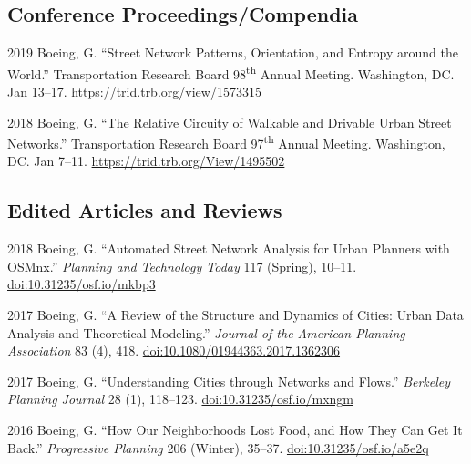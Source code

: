 \documentclass[12pt,letterpaper]{report}
\begin{document}
    \subsection*{Conference Proceedings/Compendia}

    \begin{tablist}

        \item[2019] \tab Boeing, G. \enquote{Street Network Patterns, Orientation, and Entropy around the World.} Transportation Research Board 98\textsuperscript{th} Annual Meeting. Washington, DC. Jan 13--17. \href{https://trid.trb.org/view/1573315}{https://trid.trb.org/view/1573315}

        \item[2018] \tab Boeing, G. \enquote{The Relative Circuity of Walkable and Drivable Urban Street Networks.} Transportation Research Board 97\textsuperscript{th} Annual Meeting. Washington, DC. Jan 7--11. \href{https://trid.trb.org/View/1495502}{https://trid.trb.org/View/1495502}

    \end{tablist}



    \subsection*{Edited Articles and Reviews}

    \begin{tablist}

        \item[2018] \tab Boeing, G. \enquote{Automated Street Network Analysis for Urban Planners with OSMnx.} \textit{Planning and Technology Today} 117 (Spring), 10--11. \href{https://doi.org/10.31235/osf.io/mkbp3}{doi:10.31235/osf.io/mkbp3}

        \item[2017] \tab Boeing, G. \enquote{A Review of the Structure and Dynamics of Cities: Urban Data Analysis and Theoretical Modeling.} \textit{Journal of the American Planning Association} 83 (4), 418. \href{https://doi.org/10.1080/01944363.2017.1362306}{doi:10.1080/01944363.2017.1362306}

        \item[2017] \tab Boeing, G. \enquote{Understanding Cities through Networks and Flows.} \textit{Berkeley Planning Journal} 28 (1), 118--123. \href{https://doi.org/10.31235/osf.io/mxngm}{doi:10.31235/osf.io/mxngm}

        \item[2016] \tab Boeing, G. \enquote{How Our Neighborhoods Lost Food, and How They Can Get It Back.} \textit{Progressive Planning} 206 (Winter), 35--37. \href{https://doi.org/10.31235/osf.io/a5e2q}{doi:10.31235/osf.io/a5e2q}

    \end{tablist}
\end{document}
